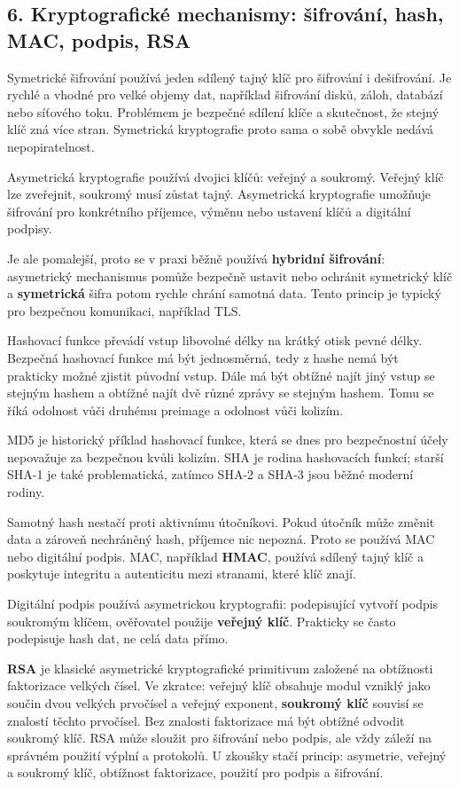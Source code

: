 \subsection*{6. Kryptografické mechanismy: šifrování, hash, MAC, podpis, RSA}

Symetrické šifrování používá jeden sdílený tajný klíč pro šifrování i dešifrování. Je rychlé a vhodné pro velké objemy dat, například šifrování disků, záloh, databází nebo síťového toku. Problémem je bezpečné sdílení klíče a skutečnost, že stejný klíč zná více stran. Symetrická kryptografie proto sama o sobě obvykle nedává nepopiratelnost.

Asymetrická kryptografie používá dvojici klíčů: veřejný a soukromý. Veřejný klíč lze zveřejnit, soukromý musí zůstat tajný. Asymetrická kryptografie umožňuje šifrování pro konkrétního příjemce, výměnu nebo ustavení klíčů a digitální podpisy.

Je ale pomalejší, proto se v praxi běžně používá \textbf{hybridní šifrování}: asymetrický mechanismus pomůže bezpečně ustavit nebo ochránit symetrický klíč a \textbf{symetrická} šifra potom rychle chrání samotná data. Tento princip je typický pro bezpečnou komunikaci, například TLS.

Hashovací funkce převádí vstup libovolné délky na krátký otisk pevné délky. Bezpečná hashovací funkce má být jednosměrná, tedy z hashe nemá být prakticky možné zjistit původní vstup. Dále má být obtížné najít jiný vstup se stejným hashem a obtížné najít dvě různé zprávy se stejným hashem. Tomu se říká odolnost vůči druhému preimage a odolnost vůči kolizím.

MD5 je historický příklad hashovací funkce, která se dnes pro bezpečnostní účely nepovažuje za bezpečnou kvůli kolizím. SHA je rodina hashovacích funkcí; starší SHA-1 je také problematická, zatímco SHA-2 a SHA-3 jsou běžné moderní rodiny.

Samotný hash nestačí proti aktivnímu útočníkovi. Pokud útočník může změnit data a zároveň nechráněný hash, příjemce nic nepozná. Proto se používá MAC nebo digitální podpis. MAC, například \textbf{HMAC}, používá sdílený tajný klíč a poskytuje integritu a autenticitu mezi stranami, které klíč znají.

Digitální podpis používá asymetrickou kryptografii: podepisující vytvoří podpis soukromým klíčem, ověřovatel použije \textbf{veřejný klíč}. Prakticky se často podepisuje hash dat, ne celá data přímo.

\textbf{RSA} je klasické asymetrické kryptografické primitivum založené na obtížnosti faktorizace velkých čísel. Ve zkratce: veřejný klíč obsahuje modul vzniklý jako součin dvou velkých prvočísel a veřejný exponent, \textbf{soukromý klíč} souvisí se znalostí těchto prvočísel. Bez znalosti faktorizace má být obtížné odvodit soukromý klíč. RSA může sloužit pro šifrování nebo podpis, ale vždy záleží na správném použití výplní a protokolů. U zkoušky stačí princip: asymetrie, veřejný a soukromý klíč, obtížnost faktorizace, použití pro podpis a šifrování.

